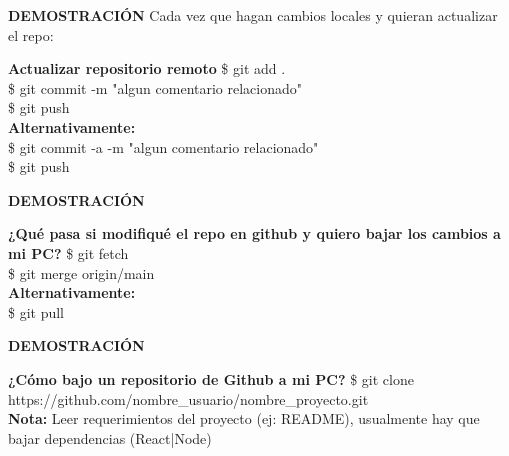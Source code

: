 \documentclass{beamer}
\begin{document}
	\begin{frame}
		\textbf{DEMOSTRACIÓN} Cada vez que hagan cambios locales y quieran actualizar el repo:
		\begin{block}{\textbf{Actualizar repositorio remoto}}
			\small \$ git add . \\
			\vspace{0.3cm}
			\small \$ git commit -m "algun comentario relacionado"\\
			\vspace{0.3cm}
			\small \$ git push \\
			\vspace{0.3cm}
			\textbf{Alternativamente:}\\
			\vspace{0.3cm}
			\small \$ git commit -a -m "algun comentario relacionado"\\
			\vspace{0.3cm}
			\small \$ git push \\
			\vspace{0.3cm}
		\end{block}	
	\end{frame}

	\begin{frame}
		\textbf{DEMOSTRACIÓN} 
		\begin{block}{\textbf{¿Qué pasa si modifiqué el repo en github y quiero bajar los cambios a mi PC?}}
			\vspace{0.3cm}
			\small \$ git fetch \\
			\vspace{0.3cm}
			\small \$ git merge origin/main\\
			\vspace{0.3cm}
			\textbf{Alternativamente:}\\
			\vspace{0.3cm}
			\small \$ git pull
			\vspace{0.3cm}
		\end{block}	
	\end{frame}

	\begin{frame}
	\textbf{DEMOSTRACIÓN} 
		\vspace{.5cm}
		\begin{block}{\textbf{¿Cómo bajo un repositorio de Github a mi PC?}}
			\vspace{0.3cm}
			\small \$ git clone https://github.com/nombre\_usuario/nombre\_proyecto.git \\
			\vspace{0.3cm}
			\textbf{Nota:} Leer requerimientos del proyecto (ej: README), usualmente hay que bajar dependencias (React|Node)
		\end{block}	
	\end{frame}
\end{document}
